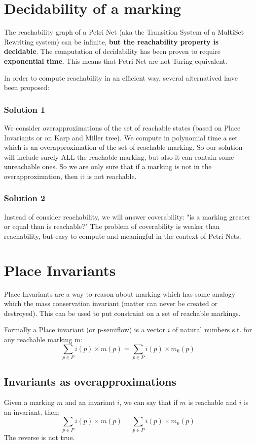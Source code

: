 \section{Decidability of a marking}
The reachability graph of a Petri Net (aka the Transition System of a MultiSet Rewriting system) can be infinite, \textbf{but the reachability property is decidable}. The computation of decidability has been proven to require \textbf{exponential time}. This means that Petri Net are not Turing equivalent.\par
In order to compute reachability in an efficient way, several alternatived have been proposed:

\subsubsection{Solution 1}
We consider overapproximations of the set of reachable states (based on Place Invariants or on Karp and Miller tree). We compute in polynomial time a set which is an overapproximation of the set of reachable marking. So our solution will include surely ALL the reachable marking, but also it can contain some unreachable ones. So we are only sure that if a marking is not in the overapproximation, then it is not reachable.

\subsubsection{Solution 2}
Instead of consider reachability, we will answer coverability: "is a marking greater or equal than is reachable?" The problem of coverability is weaker than reachability, but easy to compute and meaningful in the context of Petri Nets.

\section{Place Invariants}
Place Invariants are a way to reason about marking which has some analogy which the mass conservation invariant (matter can never be created or destroyed). This can be used to put constraint on a set of reachable markings.\par
Formally a Place invariant (or p-semiflow) is a vector $i$ of natural numbers s.t. for any reachable marking m:
\begin{equation*}
    \sum_{p \in P} i(p) \times m(p) = \sum_{p \in P} i(p) \times m_{0}(p)
\end{equation*}

\subsection{Invariants as overapproximations}
Given a marking $m$ and an invariant $i$, we can say that if $m$ is reachable and $i$ is an invariant, then:
\begin{equation*}
    \sum_{p \in P} i(p) \times m(p) = \sum_{p \in P} i(p) \times m_{0}(p)
\end{equation*}
The reverse is not true.

